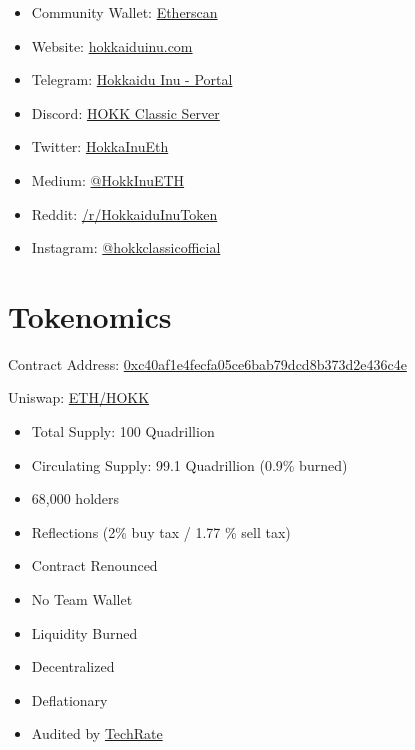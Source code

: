 \documentclass{article}
\begin{document}
\bigskip
\begin{tcolorbox}[enhanced,attach boxed title to top center={yshift=-3mm,yshifttext=-1mm},
  colback=salmon1!10!white,colframe=pink1,colbacktitle=pink1,
  title=Community Links,fonttitle=\bfseries,
  boxed title style={size=small,colframe=pink1} ]
  \begin{itemize}
  \item Community Wallet: \href{https://etherscan.io/address/0x7e1F96f302fd029585B6C9d05A80A54Bc5533A84}{Etherscan}
  \item Website: \href{https://hokkaiduinu.com/}{hokkaiduinu.com}
  \item Telegram: \href{https://t.me/HokkaiduInuOfficial}{Hokkaidu Inu - Portal}
  \item Discord: \href{https://discord.gg/tY2JsTXP}{HOKK Classic Server}
  \item Twitter: \href{https://twitter.com/HokkaInuEth}{HokkaInuEth}
  \item Medium: \href{https://medium.com/@HokkInuETH}{@HokkInuETH}
  \item Reddit: \href{https://reddit.com/r/HokkaiduInuToken}{/r/HokkaiduInuToken}
  \item Instagram: \href{https://www.instagram.com/hokkclassicofficial/}{@hokkclassicofficial}
  \end{itemize}
\end{tcolorbox}

\newpage
\section{Tokenomics}
Contract Address: \href{https://etherscan.io/token/0xc40af1e4fecfa05ce6bab79dcd8b373d2e436c4e}{0xc40af1e4fecfa05ce6bab79dcd8b373d2e436c4e}

\smallskip
{\raggedleft Uniswap: \href{https://v2.info.uniswap.org/pair/0x9314941c11d6dee1d7bf93113eb74d4718949f3b}{ETH/HOKK}}

\bigskip
\begin{tcolorbox}[enhanced,attach boxed title to top center={yshift=-3mm,yshifttext=-1mm},
  colback=salmon1!10!white,colframe=pink1,colbacktitle=pink1,
  title=Fast Facts,fonttitle=\bfseries,
  boxed title style={size=small,colframe=pink1} ]
  \begin{itemize}
  \item Total Supply: 100 Quadrillion
  \item Circulating Supply: 99.1 Quadrillion (0.9\% burned)
  \item 68,000 holders
  \item Reflections (2\% buy tax / 1.77 \% sell tax)
  \item Contract Renounced
  \item No Team Wallet
  \item Liquidity Burned
  \item Decentralized
  \item Deflationary
  \item Audited by \href{https://github.com/TechRate/Smart-Contract-Audits/blob/main/2018-21%20A-M/Hokkaidu%20Inu.pdf}{TechRate}
\end{itemize}
\end{tcolorbox}
\end{document}
